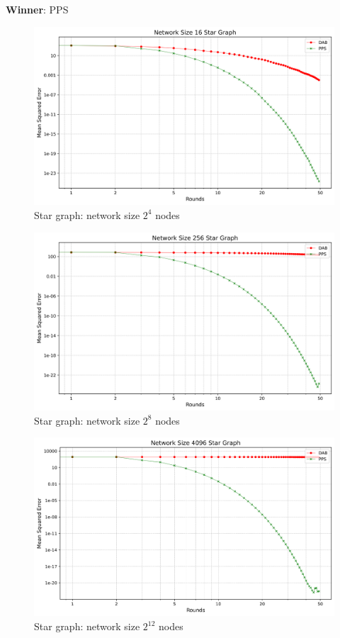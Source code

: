 \textbf{Winner}: PPS
\begin{figure}[H]
    \centering
    \includegraphics[scale=0.5]{figures/starGraphSimulations/DAB_vs_PPS_SG_r50_n16.png}
    \caption{Star graph: network size $2^{4}$ nodes}
    \label{fig:16StarGraph}
\end{figure}

\begin{figure}[H]
    \centering
    \includegraphics[scale=0.5]{figures/starGraphSimulations/DAB_vs_PPS_SG_r50_n256.png}
    \caption{Star graph: network size $2^{8}$ nodes}
    \label{fig:256StarGraph}
\end{figure}

\begin{figure}[H]
    \centering
    \includegraphics[scale=0.5]{figures/starGraphSimulations/DAB_vs_PPS_SG_r50_n4096.png}
    \caption{Star graph: network size $2^{12}$ nodes}
    \label{fig:4096StarGraph}
\end{figure}


